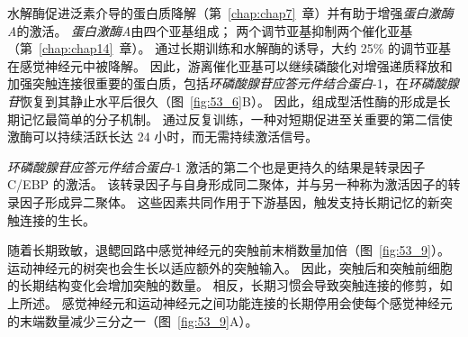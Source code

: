 水解酶促进泛素介导的蛋白质降解（第~\ref{chap:chap7}~章）并有助于增强\textit{蛋白激酶A}的激活。
\textit{蛋白激酶A}由四个亚基组成；
两个调节亚基抑制两个催化亚基（第~\ref{chap:chap14}~章）。
通过长期训练和水解酶的诱导，大约 25\% 的调节亚基在感觉神经元中被降解。
因此，游离催化亚基可以继续磷酸化对增强递质释放和加强突触连接很重要的蛋白质，包括\textit{环磷酸腺苷应答元件结合蛋白}-1，在\textit{环磷酸腺苷}恢复到其静止水平后很久（图~\ref{fig:53_6}B）。
因此，组成型活性酶的形成是长期记忆最简单的分子机制。
通过反复训练，一种对短期促进至关重要的第二信使激酶可以持续活跃长达 24 小时，而无需持续激活信号。


\textit{环磷酸腺苷应答元件结合蛋白}-1 激活的第二个也是更持久的结果是转录因子 C/EBP 的激活。
该转录因子与自身形成同二聚体，并与另一种称为激活因子的转录因子形成异二聚体。
这些因素共同作用于下游基因，触发支持长期记忆的新突触连接的生长。


随着长期致敏，退鳃回路中感觉神经元的突触前末梢数量加倍（图~\ref{fig:53_9}）。
运动神经元的树突也会生长以适应额外的突触输入。
因此，突触后和突触前细胞的长期结构变化会增加突触的数量。
相反，长期习惯会导致突触连接的修剪，如上所述。
感觉神经元和运动神经元之间功能连接的长期停用会使每个感觉神经元的末端数量减少三分之一（图~\ref{fig:53_9}A）。


